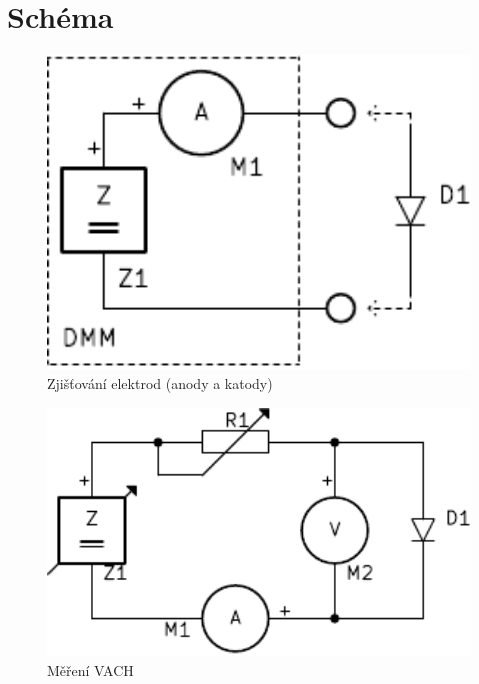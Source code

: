 \section{Schéma}
  \begin{figure}[H]
    \centering
    \includegraphics[width=13cm]{../img/pol.pdf}
    \caption{Zjišťování elektrod (anody a katody)}
    \label{sch:2}
  \end{figure}
  
  \begin{figure}[H]
    \centering
    \includegraphics[width=13cm]{../img/201-3R.pdf}
    \caption{Měření VACH}
    \label{sch:2}
  \end{figure}
